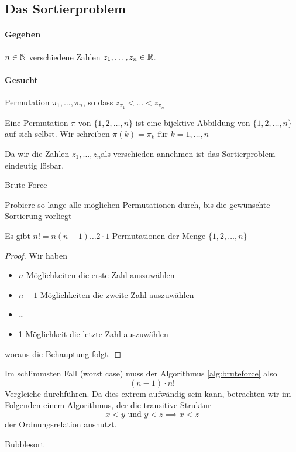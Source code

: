 \subsection{Das Sortierproblem}
\paragraph{Gegeben} $n \in \mathbb{N}$ verschiedene Zahlen $z_1,\ldots,z_n \in \mathbb{R}$.
\paragraph{Gesucht} Permutation $\pi_1,\ldots,\pi_n$, so dass $z_{\pi_1} < \ldots < z_{\pi_n}$
\begin{definition}[Permutation]
Eine Permutation $\pi$ von $\{1,2,\ldots, n\}$ ist eine bijektive Abbildung von $\{1,2,\ldots,n\} $ auf sich selbst. Wir schreiben $\pi(k)=\pi_k$ für $k=1,\ldots,n$
\end{definition}
\begin{remark}
Da wir die Zahlen $z_1,\ldots,z_n$als verschieden annehmen ist das Sortierproblem eindeutig lösbar.
\end{remark}
\begin{algorithm}
\label{alg:bruteforce}
\caption{Brute-Force}
Probiere so lange alle möglichen Permutationen durch, bis die gewünschte Sortierung vorliegt
\end{algorithm}
\begin{theorem}
Es gibt $n! = n(n-1)\ldots 2 \cdot 1$ Permutationen der Menge $\{1,2,\ldots,n\} $
\end{theorem}
\begin{proof}
Wir haben 
\begin{itemize}
	\item $n$ Möglichkeiten die erste Zahl auszuwählen
	\item $n-1$ Möglichkeiten die zweite Zahl auszuwählen
	\item \ldots
	\item 1 Möglichkeit die letzte Zahl auszuwählen
\end{itemize}
woraus die Behauptung folgt.
\end{proof}
Im schlimmsten Fall (worst case) muss der Algorithmus \ref{alg:bruteforce} also
\[
	(n-1)\cdot n!
\]
Vergleiche durchführen. Da dies extrem aufwändig sein kann, betrachten wir im Folgenden einem Algorithmus, der die transitive Struktur
\[
x<y \text{ und } y<z \implies x<z
\]
der Ordnungsrelation ausnutzt. \\
\begin{algorithm}[H]
\caption{Bubblesort}
\label{alg:bubblesort}
\end{algorithm}
